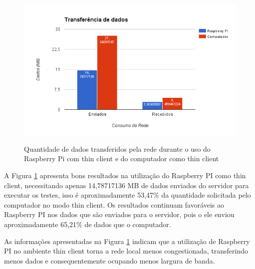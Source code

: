 \documentclass[
	12pt,				%
	openright,			%
	twoside,			%
	a4paper,			%
	chapter=TITLE,		%
	english,			%
	brazil				%
	]{abntex2}
\begin{document}
\begin{figure}[!htb]
\centering
\caption{Quantidade de dados transferidos pela rede durante o uso do Raspberry Pi com thin client e do computador como thin client}
\includegraphics[scale=0.8]{Imagens/net}
\label{fig:net}
\end{figure}

A Figura \ref{fig:net} apresenta bons resultados na utilização do Raspberry PI como thin client, necessitando apenas 14,78717136 MB de dados enviados  do servidor para executar os testes, isso é aproximadamente 53,47\% da quantidade solicitada pelo computador no modo thin client. Os resultados continuam favoráveis ao Raspberry PI nos dados que são enviados para o servidor, pois o ele enviou aproximadamente 65,21\% de dados que o computador.

As informações apresentadas na Figura \ref{fig:net} indicam que a utilização de Raspberry PI no ambiente thin client torna a rede local menos congestionada, transferindo menos dados e consequentemente ocupando menos largura de banda. 




\end{document}
